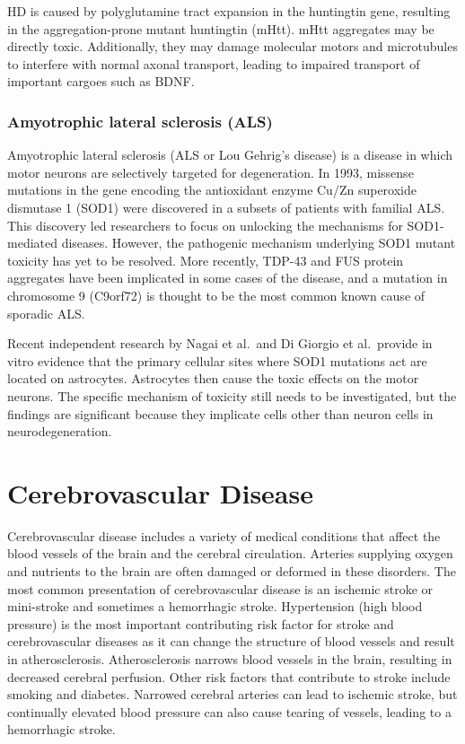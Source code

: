 HD is caused by polyglutamine tract expansion in the huntingtin gene,
resulting in the aggregation-prone mutant huntingtin (mHtt). mHtt
aggregates may be directly toxic. Additionally, they may damage
molecular motors and microtubules to interfere with normal axonal
transport, leading to impaired transport of important cargoes such as
BDNF.

\hypertarget{amyotrophic-lateral-sclerosis-als}{%
\subsubsection{Amyotrophic lateral sclerosis
(ALS)}\label{amyotrophic-lateral-sclerosis-als}}

Amyotrophic lateral sclerosis (ALS or Lou Gehrig's disease) is a disease
in which motor neurons are selectively targeted for degeneration. In
1993, missense mutations in the gene encoding the antioxidant enzyme
Cu/Zn superoxide dismutase 1 (SOD1) were discovered in a subsets of
patients with familial ALS. This discovery led researchers to focus on
unlocking the mechanisms for SOD1-mediated diseases. However, the
pathogenic mechanism underlying SOD1 mutant toxicity has yet to be
resolved. More recently, TDP-43 and FUS protein aggregates have been
implicated in some cases of the disease, and a mutation in chromosome 9
(C9orf72) is thought to be the most common known cause of sporadic ALS.

Recent independent research by Nagai et al.~and Di Giorgio et
al.~provide in vitro evidence that the primary cellular sites where SOD1
mutations act are located on astrocytes. Astrocytes then cause the toxic
effects on the motor neurons. The specific mechanism of toxicity still
needs to be investigated, but the findings are significant because they
implicate cells other than neuron cells in neurodegeneration.

\hypertarget{cerebrovascular-disease}{%
\section{Cerebrovascular Disease}\label{cerebrovascular-disease}}

Cerebrovascular disease includes a variety of medical conditions that
affect the blood vessels of the brain and the cerebral circulation.
Arteries supplying oxygen and nutrients to the brain are often damaged
or deformed in these disorders. The most common presentation of
cerebrovascular disease is an ischemic stroke or mini-stroke and
sometimes a hemorrhagic stroke. Hypertension (high blood pressure) is
the most important contributing risk factor for stroke and
cerebrovascular diseases as it can change the structure of blood vessels
and result in atherosclerosis. Atherosclerosis narrows blood vessels in
the brain, resulting in decreased cerebral perfusion. Other risk factors
that contribute to stroke include smoking and diabetes. Narrowed
cerebral arteries can lead to ischemic stroke, but continually elevated
blood pressure can also cause tearing of vessels, leading to a
hemorrhagic stroke.

